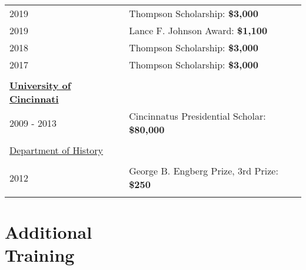\documentclass[margin,line,pifont,palatino,courier]{res}
\newenvironment{list1}{
  \begin{list}{\ding{113}}{%
      \setlength{\itemsep}{0in}
      \setlength{\parsep}{0in} \setlength{\parskip}{0in}
      \setlength{\topsep}{0in} \setlength{\partopsep}{0in}
      \setlength{\leftmargin}{0.17in}}}{\end{list}}
\begin{document}
\begin{resume}
\begin{tabular}{ll}
  2019       & Thompson Scholarship: \bf{\$3,000}\\
  2019       & Lance F. Johnson Award: \bf{\$1,100}\\
  2018       & Thompson Scholarship: \bf{\$3,000}\\
  2017       & Thompson Scholarship: \bf{\$3,000}\\
  \\
  \textbf{\underline{University of Cincinnati}}&\\
  2009 - 2013 & Cincinnatus Presidential Scholar: \bf{\$80,000}\\
  \\
  \underline{Department of History}&\\
  \\
  2012       & George B. Engberg Prize, 3rd Prize: \bf{\$250}  \\
  \\
\end{tabular}





\section{\sc Additional\\ Training}


\end{resume}
\end{document}
